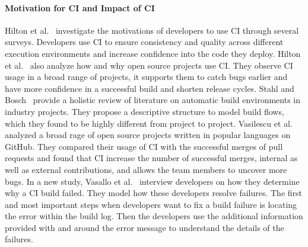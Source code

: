 \documentclass[\myrootdir/main.tex]{subfiles}
\begin{document}
\paragraph{Motivation for CI and Impact of CI}
Hilton et al.~\cite{hilton2017trade-offs} investigate the motivations of developers to use CI through several surveys.
Developers use CI to ensure consistency and quality across different execution environments and increase confidence into the code they deploy.
Hilton et al.~\cite{hilton2016usage} also analyze how and why open source projects use CI\@.
They observe CI usage in a broad range of projects, it supports them to catch bugs earlier and have more confidence in a successful build and shorten release cycles.
Stahl and Bosch~\cite{staahl2014modeling} provide a holistic review of literature on automatic build environments in industry projects.
They propose a descriptive structure to model build flows, which they found to be highly different from project to project.
Vasilescu et al.~\cite{vasilescu2015quality} analyzed a broad rage of open source projects written in popular languages on GitHub.
They compared their usage of CI with the successful merges of pull requests and found that CI increase the number of successful merges, internal as well as external contributions, and allows the team members to uncover more bugs.
In a new study, Vasallo et al.~\cite{vassallo2019every} interview developers on how they determine why a CI build failed.
They model how these developers resolve failures.
The first and most important steps when developers want to fix a build failure is locating the error within the build log.
Then the developers use the additional information provided with and around the error message to understand the details of the failures.
\end{document}
